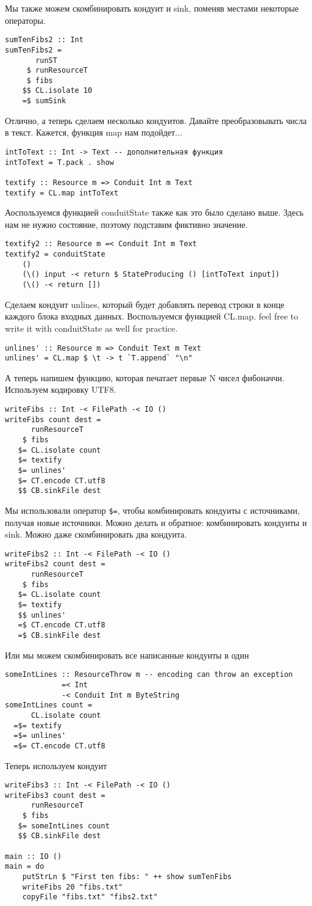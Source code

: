 Мы также можем скомбинировать кондуит и sink, поменяв местами некоторые операторы.
\begin{verbatim}sumTenFibs2 :: Int
sumTenFibs2 =
       runST
     $ runResourceT
     $ fibs
    $$ CL.isolate 10
    =$ sumSink
\end{verbatim}
Отлично, а теперь сделаем несколько кондуитов. Давайте преобразовывать числа в текст.
Кажется, функция map нам подойдет...
\begin{verbatim}
intToText :: Int -> Text -- дополнительная функция 
intToText = T.pack . show

textify :: Resource m => Conduit Int m Text
textify = CL.map intToText
\end{verbatim}
Аоспользуемся функцией conduitState также как это было сделано выше. Здесь нам не нужно
состояние, поэтому подставим фиктивно значение.
\begin{verbatim}textify2 :: Resource m =< Conduit Int m Text
textify2 = conduitState
    ()
    (\() input -< return $ StateProducing () [intToText input])
    (\() -< return [])
\end{verbatim}
Сделаем кондуит unlines, который будет добавлять перевод строки в конце каждого блока
входных данных. Воспользуемся функцией CL.map. feel free to write it with conduitState as
well for practice.
\begin{verbatim}unlines' :: Resource m => Conduit Text m Text
unlines' = CL.map $ \t -> t `T.append` "\n"
\end{verbatim}
А теперь напишем функцию, которая печатает первые N чисел фибоначчи. Используем
кодировку UTF8.
\begin{verbatim}writeFibs :: Int -< FilePath -< IO ()
writeFibs count dest =
      runResourceT
    $ fibs
   $= CL.isolate count
   $= textify
   $= unlines'
   $= CT.encode CT.utf8
   $$ CB.sinkFile dest
\end{verbatim}
Мы использовали оператор \verb#$=#, чтобы комбинировать кондуиты с источниками, получая
новые источники. Можно делать и обратное: комбинировать кондуиты и sink. Можно даже
скомбинировать два кондуита.
\begin{verbatim}writeFibs2 :: Int -< FilePath -< IO ()
writeFibs2 count dest =
      runResourceT
    $ fibs
   $= CL.isolate count
   $= textify
   $$ unlines'
   =$ CT.encode CT.utf8
   =$ CB.sinkFile dest
\end{verbatim}
Или мы можем скомбинировать все написанные кондуиты в один
\begin{verbatim}someIntLines :: ResourceThrow m -- encoding can throw an exception
             =< Int
             -< Conduit Int m ByteString
someIntLines count =
      CL.isolate count
  =$= textify
  =$= unlines'
  =$= CT.encode CT.utf8
\end{verbatim}
Теперь используем кондуит
\begin{verbatim}
writeFibs3 :: Int -< FilePath -< IO ()
writeFibs3 count dest =
      runResourceT
    $ fibs
   $= someIntLines count
   $$ CB.sinkFile dest

main :: IO ()
main = do
    putStrLn $ "First ten fibs: " ++ show sumTenFibs
    writeFibs 20 "fibs.txt"
    copyFile "fibs.txt" "fibs2.txt"
\end{verbatim}

